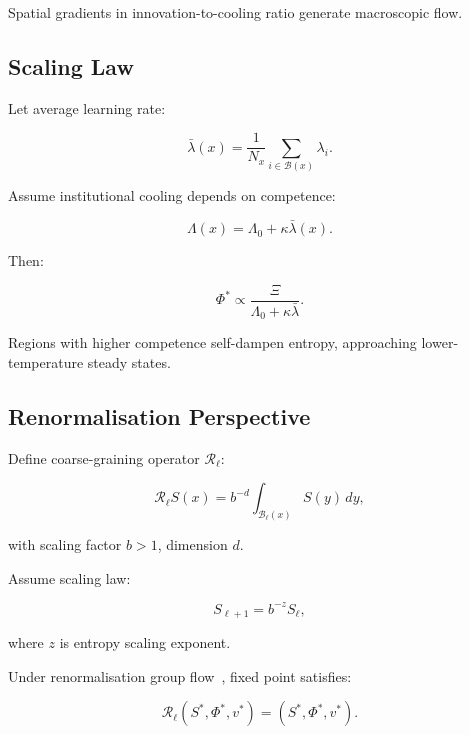 \documentclass[12pt,a4paper]{article}
\theoremstyle{definition}
\begin{document}
Spatial gradients in innovation-to-cooling ratio
generate macroscopic flow.

\subsection{Scaling Law}

Let average learning rate:

\begin{equation}
  \bar{\lambda}(x)
  =
  \frac{1}{N_x}
  \sum_{i \in \mathcal{B}(x)} \lambda_i.
\end{equation}

Assume institutional cooling depends on competence:

\begin{equation}
  \Lambda(x)
  =
  \Lambda_0 + \kappa \bar{\lambda}(x).
\end{equation}

Then:

\begin{equation}
  \Phi^*
  \propto
  \frac{\Xi}{\Lambda_0 + \kappa \bar{\lambda}}.
\end{equation}

Regions with higher competence self-dampen entropy,
approaching lower-temperature steady states.

\subsection{Renormalisation Perspective}

Define coarse-graining operator $\mathcal{R}_\ell$:

\begin{equation}
  \mathcal{R}_\ell S(x)
  =
  b^{-d}
  \int_{\mathcal{B}_\ell(x)} S(y)\, dy,
\end{equation}

with scaling factor $b > 1$, dimension $d$.

Assume scaling law:

\begin{equation}
  S_{\ell+1}
  =
  b^{-z} S_\ell,
\end{equation}

where $z$ is entropy scaling exponent.

Under renormalisation group flow~\citep{wilson1971},
fixed point satisfies:

\begin{equation}
  \mathcal{R}_\ell (S^*, \Phi^*, v^*)
  =
  (S^*, \Phi^*, v^*).
\end{equation}
\end{document}

